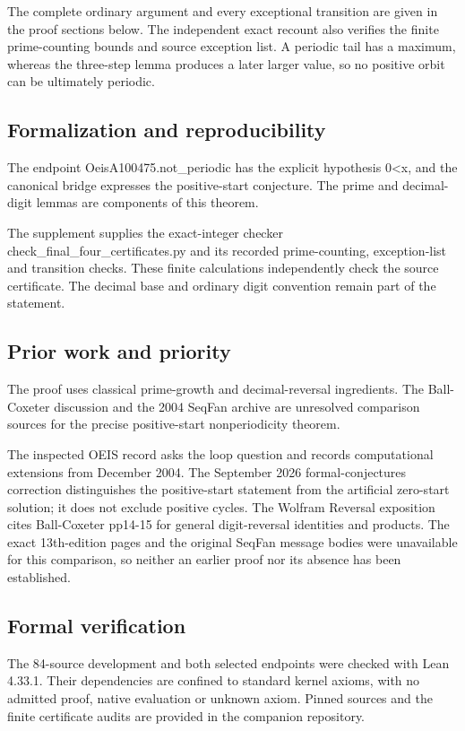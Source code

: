 \documentclass[11pt,a4paper]{article}
\begin{document}
The complete ordinary argument and every exceptional transition are given in the proof sections below. The independent exact recount also verifies the finite prime-counting bounds and source exception list. A periodic tail has a maximum, whereas the three-step lemma produces a later larger value, so no positive orbit can be ultimately periodic.

\subsection{Formalization and reproducibility}
The endpoint OeisA100475.not\_periodic has the explicit hypothesis 0<x, and the canonical bridge expresses the positive-start conjecture. The prime and decimal-digit lemmas are components of this theorem.

The supplement supplies the exact-integer checker check\_final\_four\_certificates.py and its recorded prime-counting, exception-list and transition checks. These finite calculations independently check the source certificate. The decimal base and ordinary digit convention remain part of the statement.

\subsection{Prior work and priority}
The proof uses classical prime-growth and decimal-reversal ingredients. The Ball-Coxeter discussion and the 2004 SeqFan archive are unresolved comparison sources for the precise positive-start nonperiodicity theorem.

The inspected OEIS record asks the loop question and records computational extensions from December 2004. The September 2026 formal-conjectures correction distinguishes the positive-start statement from the artificial zero-start solution; it does not exclude positive cycles. The Wolfram Reversal exposition cites Ball-Coxeter pp14-15 for general digit-reversal identities and products. The exact 13th-edition pages and the original SeqFan message bodies were unavailable for this comparison, so neither an earlier proof nor its absence has been established.

\subsection{Formal verification}
The 84-source development and both selected endpoints were checked with Lean 4.33.1. Their dependencies are confined to standard kernel axioms, with no admitted proof, native evaluation or unknown axiom. Pinned sources and the finite certificate audits are provided in the companion repository.
\end{document}
